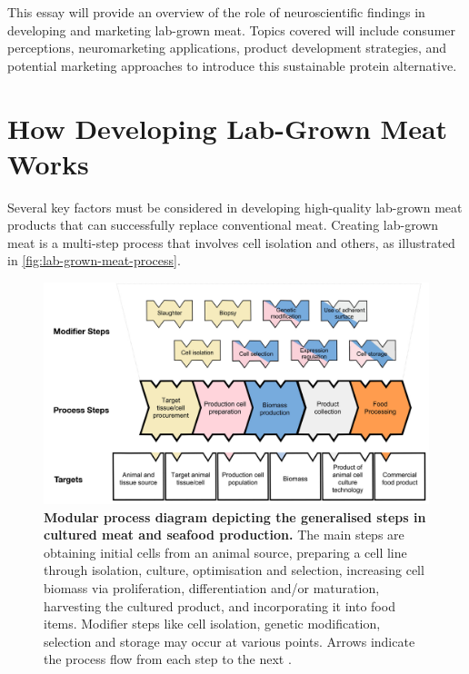 \documentclass[10pt]{article}
\begin{document}
\begin{sloppypar}
  This essay will provide an overview of the role of neuroscientific findings in developing and marketing lab-grown meat. Topics covered will include consumer perceptions, neuromarketing applications, product development strategies, and potential marketing approaches to introduce this sustainable protein alternative.

  \section{How Developing Lab-Grown Meat Works}
  \label{sec:developing-lab-grown-meat}

  Several key factors must be considered in developing high-quality lab-grown meat products that can successfully replace conventional meat. Creating lab-grown meat is a multi-step process that involves cell isolation and others, as illustrated in \autoref{fig:lab-grown-meat-process}.

  \begin{figure}[ht]
    \centering
    \includegraphics[width=\textwidth]{figures/lab-grown-meat-step.png}
    \caption[Modular process diagram depicting the generalised steps in cultured meat and seafood production.]{\textbf{Modular process diagram depicting the generalised steps in cultured meat and seafood production.} The main steps are obtaining initial cells from an animal source, preparing a cell line through isolation, culture, optimisation and selection, increasing cell biomass via proliferation, differentiation and/or maturation, harvesting the cultured product, and incorporating it into food items. Modifier steps like cell isolation, genetic modification, selection and storage may occur at various points. Arrows indicate the process flow from each step to the next \citep{ong_food_2021}.}
    \label{fig:lab-grown-meat-process}
  \end{figure}


\end{sloppypar}
\end{document}
